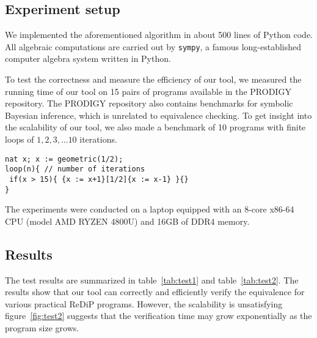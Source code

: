 \documentclass[a4paper]{article}
\begin{document}
\subsection{Experiment setup}

We implemented the aforementioned algorithm in about 500 lines of Python code. All algebraic computations are carried out by \texttt{sympy}\cite{sympy}, a famous long-established computer algebra system written in Python.\par
To test the correctness and measure the efficiency of our tool, we measured the running time of our tool on 15 pairs of programs available in the PRODIGY repository. The PRODIGY repository also contains benchmarks for symbolic Bayesian inference, which is unrelated to equivalence checking. To get insight into the scalability of our tool, we also made a benchmark of 10 programs with finite loops of \(1,2,3,\ldots 10\) iterations.
\begin{tcolorbox}
	\begin{verbatim}
nat x; x := geometric(1/2);
loop(n){ // number of iterations
 if(x > 15){ {x := x+1}[1/2]{x := x-1} }{}
}
\end{verbatim}
\end{tcolorbox}
The experiments were conducted on a laptop equipped with an 8-core x86-64 CPU (model AMD RYZEN 4800U) and 16GB of DDR4 memory.

\subsection{Results}

The test results are summarized in table~\ref{tab:test1} and table~\ref{tab:test2}.
The results show that our tool can correctly and efficiently verify the equivalence for various practical ReDiP programs.
However, the scalability is unsatisfying figure~\ref{fig:test2} suggests that the verification time may grow exponentially as the program size grows.
\end{document}
